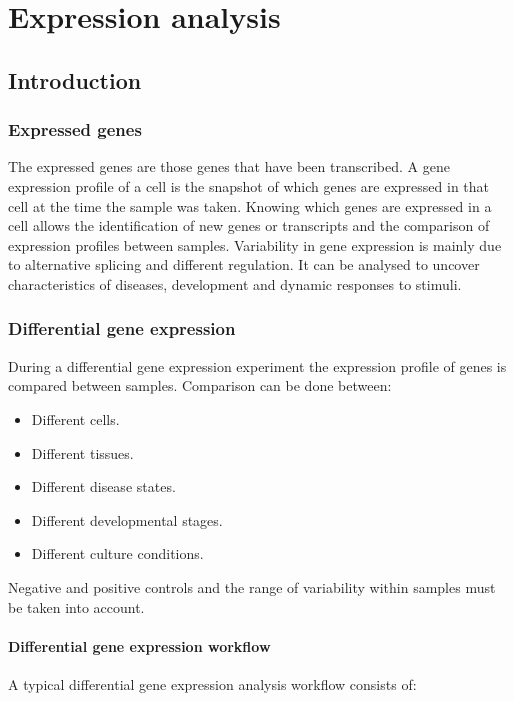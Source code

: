 \graphicspath{{chapters/05/images}}
\chapter{Expression analysis}

\section{Introduction}

	\subsection{Expressed genes}
	The expressed genes are those genes that have been transcribed.
	A gene expression profile of a cell is the snapshot of which genes are expressed in that cell at the time the sample was taken.
	Knowing which genes are expressed in a cell allows the identification of new genes or transcripts and the comparison of expression profiles between samples.
	Variability in gene expression is mainly due to alternative splicing and different regulation.
	It can be analysed to uncover characteristics of diseases, development and dynamic responses to stimuli.

	\subsection{Differential gene expression}
	During a differential gene expression experiment the expression profile of genes is compared between samples.
	Comparison can be done between:

	\begin{multicols}{2}
		\begin{itemize}
			\item Different cells.
			\item Different tissues.
			\item Different disease states.
			\item Different developmental stages.
			\item Different culture conditions.
		\end{itemize}
	\end{multicols}

	Negative and positive controls and the range of variability within samples must be taken into account.

		\subsubsection{Differential gene expression workflow}
		A typical differential gene expression analysis workflow consists of:

